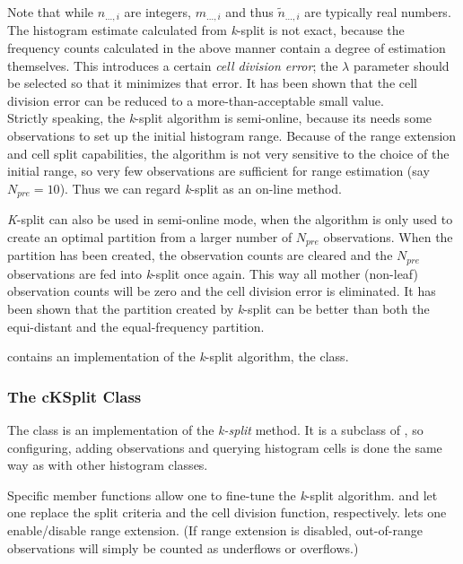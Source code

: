 
Note that while $n_{...,i}$ are integers, $m_{...,i}$ and thus
$\tilde{n}_{...,i}$ are typically real numbers. The histogram estimate
calculated from \textit{k}-split is not exact, because the frequency
counts calculated in the above manner contain a degree of estimation
themselves. This introduces a certain \textit{cell division error};
the $\lambda$ parameter should be selected so that it minimizes that
error. It has been shown that the cell division error can
be reduced to a more-than-acceptable small value.\\
Strictly speaking, the \textit{k}-split algorithm is semi-online,
because its needs some observations to set up the initial histogram
range.  Because of the range extension and cell split
capabilities, the algorithm is not very sensitive to the choice of the
initial range, so very few observations are sufficient for range
estimation (say $N_{pre}=10$). Thus we can regard \textit{k}-split as
an on-line method.

\textit{K}-split can also be used in semi-online mode, when the
algorithm is only used to create an optimal partition from a larger
number of $N_{pre}$ observations. When the partition has been created,
the observation counts are cleared and the $N_{pre}$ observations are
fed into \textit{k}-split once again. This way all mother (non-leaf)
observation counts will be zero and the cell division error is
eliminated. It has been shown that the partition created by
\textit{k}-split can be better than both the equi-distant and the
equal-frequency partition.

{\opp} contains an implementation of the \textit{k}-split algorithm,
the  class.


\subsubsection{The cKSplit Class}
\label{sec:sim-lib:cksplit-class}

The  class is an implementation of the \textit{k-split}
method. It is a subclass of , so configuring,
adding observations and querying histogram cells is done the same way as
with other histogram classes.

Specific member functions allow one to fine-tune the \textit{k}-split
algorithm.  and  let one replace
the split criteria and the cell division function, respectively.
 lets one enable/disable range extension. (If
range extension is disabled, out-of-range observations will simply be
counted as underflows or overflows.)

